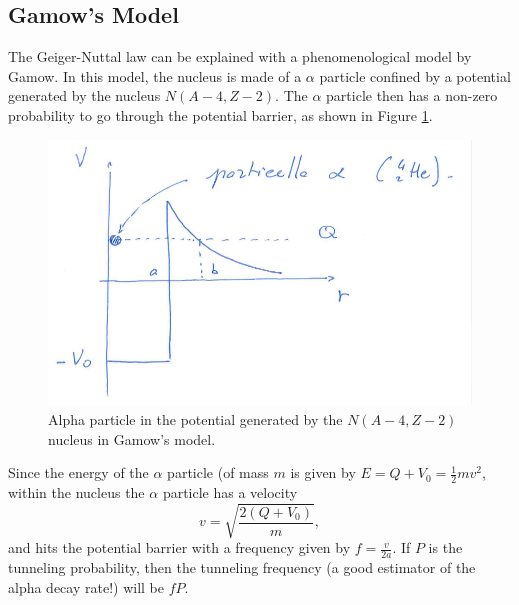 \subsection{Gamow's Model}
The Geiger-Nuttal law can be explained with a phenomenological model by Gamow. In this model, the nucleus is made of a $\alpha$ particle confined by a potential generated by the nucleus $N(A-4,Z-2)$. The $\alpha$ particle then has a non-zero probability to go through the potential barrier, as shown in Figure \ref{nuclear-physics-fig:5}.
\begin{figure}[h]
    \centering
    \includegraphics[scale=0.5]{Figures/nuclear-physics-fig5}
    \caption{Alpha particle in the potential generated by the \(N(A-4,Z-2)\) nucleus in Gamow's model.}
    \label{nuclear-physics-fig:5}
\end{figure}
Since the energy of the \(\alpha\) particle (of mass \(m\) is given by \(E=Q+V_0=\frac{1}{2}m v^2\), within the nucleus the $\alpha$ particle has a velocity
\begin{equation*}
    v = \sqrt{\frac{2(Q+V_0)}{m}},
\end{equation*}
and hits the potential barrier with a frequency given by $f = \frac{v}{2a}$. If $P$ is the tunneling probability, then the tunneling frequency (a good estimator of the alpha decay rate!) will be $fP$.

